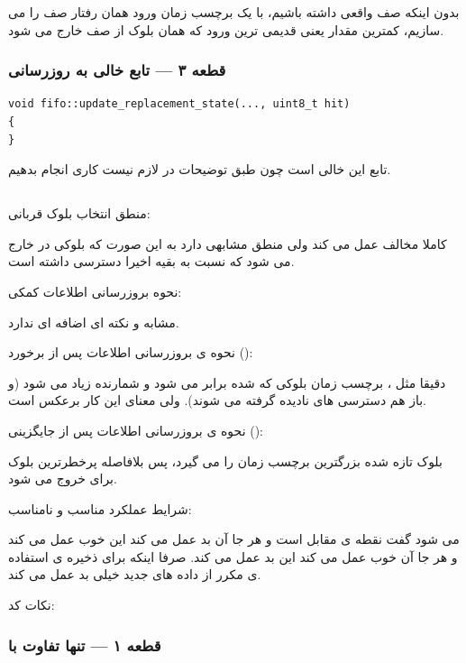 \documentclass[12pt,a4paper]{article}
\begin{document}
بدون اینکه صف واقعی داشته باشیم، با یک برچسب زمان ورود همان رفتار صف را می سازیم، کمترین مقدار یعنی قدیمی ترین ورود که همان بلوک از صف خارج می شود.

\subsubsection{قطعه ۳ — تابع خالی به روزرسانی}

\begin{latin}
\begin{lstlisting}
void fifo::update_replacement_state(..., uint8_t hit)
{
}
\end{lstlisting}
\end{latin}

تابع  این  خالی است چون طبق توضیحات در  لازم نیست کاری انجام بدهیم.

\subsection{}

منطق انتخاب بلوک قربانی:

کاملا مخالف  عمل می کند ولی منطق مشابهی دارد به این صورت که بلوکی در  خارج می شود که نسبت به بقیه اخیرا دسترسی داشته است.

نحوه بروزرسانی اطلاعات کمکی:

مشابه  و نکته ای اضافه ای ندارد.

نحوه ی بروزرسانی اطلاعات پس از برخورد ():

دقیقا مثل ، برچسب زمان بلوکی که  شده برابر  می شود و شمارنده زیاد می شود (و باز هم دسترسی های  نادیده گرفته می شوند). ولی معنای این کار برعکس  است.

نحوه ی بروزرسانی اطلاعات پس از جایگزینی ():

بلوک تازه  شده بزرگترین برچسب زمان  را می گیرد، پس بلافاصله پرخطرترین بلوک برای خروج می شود.

شرایط عملکرد مناسب و نامناسب:

می شود گفت نقطه ی مقابل  است و هر جا آن بد عمل می کند این خوب عمل می کند و هر جا آن خوب عمل می کند این بد عمل می کند. صرفا اینکه برای ذخیره ی استفاده ی مکرر از داده های جدید خیلی بد عمل می کند.

نکات کد:

\subsubsection{قطعه ۱ — تنها تفاوت با }
\end{document}
